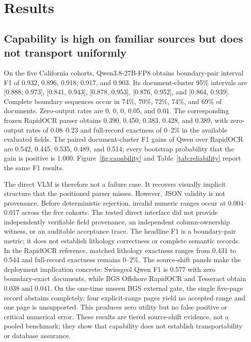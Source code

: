 \documentclass[a4paper,fleqn]{cas-sc}
\begin{document}
\section{Results}

\subsection{Capability is high on familiar sources but does not transport uniformly}

On the five California cohorts, Qwen3.8-27B-FP8 obtains boundary-pair interval F1 of 0.932, 0.896, 0.918, 0.917, and 0.903. Its document-cluster 95\% intervals are {[}0.888, 0.973{]}, {[}0.841, 0.943{]}, {[}0.878, 0.953{]}, {[}0.876, 0.952{]}, and {[}0.864, 0.939{]}. Complete boundary sequences occur in 74\%, 70\%, 72\%, 74\%, and 69\% of documents. Zero-output rates are 0, 0, 0, 0.05, and 0.01. The corresponding frozen RapidOCR parser obtains 0.390, 0.450, 0.383, 0.428, and 0.389, with zero-output rates of 0.08--0.23 and full-record exactness of 0--2\% in the available evaluated fields. The paired document-cluster F1 gains of Qwen over RapidOCR are 0.542, 0.445, 0.535, 0.489, and 0.514; every bootstrap probability that the gain is positive is 1.000. Figure~\ref{fig:capability} and Table~\ref{tab:reliability} report the same F1 results.

The direct VLM is therefore not a failure case. It recovers visually implicit structure that the positioned parser misses. However, JSON validity is not provenance. Before deterministic rejection, invalid numeric ranges occur at 0.004--0.017 across the five cohorts. The tested direct interface did not provide independently verifiable field provenance, an independent column-ownership witness, or an auditable acceptance trace. The headline F1 is a boundary-pair metric; it does not establish lithology correctness or complete semantic records. In the RapidOCR reference, matched lithology exactness ranges from 0.431 to 0.544 and full-record exactness remains 0--2\%. The source-shift panels make the deployment implication concrete: Swissgeol Qwen F1 is 0.577 with zero boundary-exact documents, while BGS Offshore RapidOCR and Tesseract obtain 0.038 and 0.041. On the one-time unseen BGS external gate, the single five-page record abstains completely: four explicit-range pages yield no accepted range and one page is unsupported. This produces zero utility but no false positive or critical numerical error. These results are tiered source-shift evidence, not a pooled benchmark; they show that capability does not establish transportability or database assurance.
\end{document}
